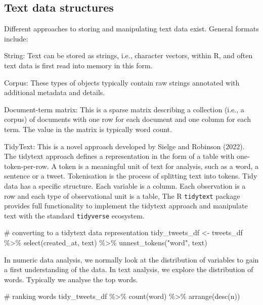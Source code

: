 \documentclass[
  letterpaper,
  DIV=11,
  numbers=noendperiod]{scrreprt}
\newenvironment{Shaded}{\begin{snugshade}}{\end{snugshade}}
\newcommand{\CommentTok}[1]{\textcolor[rgb]{0.37,0.37,0.37}{#1}}
\newcommand{\FunctionTok}[1]{\textcolor[rgb]{0.28,0.35,0.67}{#1}}
\newcommand{\NormalTok}[1]{\textcolor[rgb]{0.00,0.23,0.31}{#1}}
\newcommand{\OtherTok}[1]{\textcolor[rgb]{0.00,0.23,0.31}{#1}}
\newcommand{\SpecialCharTok}[1]{\textcolor[rgb]{0.37,0.37,0.37}{#1}}
\newcommand{\StringTok}[1]{\textcolor[rgb]{0.13,0.47,0.30}{#1}}
\begin{document}
\hypertarget{text-data-structures}{%
\subsection{Text data structures}\label{text-data-structures}}

Different approaches to storing and manipulating text data exist.
General formats include:

String: Text can be stored as strings, i.e., character vectors, within
R, and often text data is first read into memory in this form.

Corpus: These types of objects typically contain raw strings annotated
with additional metadata and details.

Document-term matrix: This is a sparse matrix describing a collection
(i.e., a corpus) of documents with one row for each document and one
column for each term. The value in the matrix is typically word count.

TidyText: This is a novel approach developed by Sielge and Robinson
(2022). The tidytext approach defines a representation in the form of a
table with one-token-per-row. A token is a meaningful unit of text for
analysis, such as a word, a sentence or a tweet. Tokenisation is the
process of splitting text into tokens. Tidy data has a specific
structure. Each variable is a column. Each observation is a row and each
type of observational unit is a table, The R \texttt{tidytext} package
provides full functionality to implement the tidytext approach and
manipulate text with the standard \texttt{tidyverse} ecosystem.

\begin{Shaded}
\begin{Highlighting}[]
\CommentTok{\# converting to a tidytext data representation}
\NormalTok{tidy\_tweets\_df }\OtherTok{\textless{}{-}}\NormalTok{ tweets\_df }\SpecialCharTok{\%\textgreater{}\%}
    \FunctionTok{select}\NormalTok{(created\_at, text) }\SpecialCharTok{\%\textgreater{}\%}
    \FunctionTok{unnest\_tokens}\NormalTok{(}\StringTok{"word"}\NormalTok{, text)}
\end{Highlighting}
\end{Shaded}

In numeric data analysis, we normally look at the distribution of
variables to gain a first understanding of the data. In text analysis,
we explore the distribution of words. Typically we analyse the top
words.

\begin{Shaded}
\begin{Highlighting}[]
\CommentTok{\# ranking words}
\NormalTok{tidy\_tweets\_df }\SpecialCharTok{\%\textgreater{}\%} 
  \FunctionTok{count}\NormalTok{(word) }\SpecialCharTok{\%\textgreater{}\%} 
  \FunctionTok{arrange}\NormalTok{(}\FunctionTok{desc}\NormalTok{(n))}
\end{Highlighting}
\end{Shaded}
\end{document}
